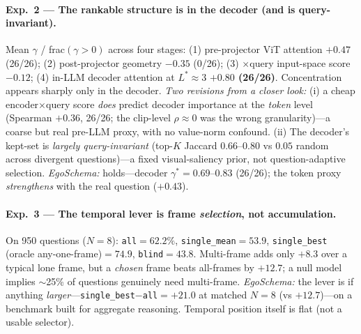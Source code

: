 \documentclass[11pt]{article}
\newcommand{\gm}{\gamma}
\begin{document}
\paragraph{Exp.~2 --- The rankable structure is in the decoder (and is query-invariant).} Mean
$\gm$ / frac$(\gm{>}0)$ across four stages: (1) pre-projector ViT attention $+0.47$ (26/26); (2)
post-projector geometry $-0.35$ (0/26); (3) $\times$query input-space score $-0.12$; (4) in-LLM
decoder attention at $L^{\!*}{\approx}3$ \textbf{$+0.80$ (26/26)}. Concentration appears sharply
only in the decoder. \emph{Two revisions from a closer look:} (i) a cheap encoder$\times$query
score \emph{does} predict decoder importance at the \emph{token} level (Spearman $+0.36$, 26/26;
the clip-level $\rho{\approx}0$ was the wrong granularity)---a coarse but real pre-LLM proxy, with
no value-norm confound. (ii) The decoder's kept-set is \emph{largely query-invariant} (top-$K$
Jaccard $0.66$--$0.80$ vs $0.05$ random across divergent questions)---a fixed visual-saliency
prior, not question-adaptive selection. \emph{EgoSchema:} holds---decoder $\gm^{*}=0.69$--$0.83$
(26/26); the token proxy \emph{strengthens} with the real question ($+0.43$).

\paragraph{Exp.~3 --- The temporal lever is frame \emph{selection}, not accumulation.} On 950
questions ($N{=}8$): \texttt{all}$=62.2\%$, \texttt{single\_mean}$=53.9$, \texttt{single\_best}
(oracle any-one-frame)$=74.9$, \texttt{blind}$=43.8$. Multi-frame adds only $+8.3$ over a typical
lone frame, but a \emph{chosen} frame beats all-frames by $+12.7$; a null model implies $\sim$25\%
of questions genuinely need multi-frame. \emph{EgoSchema:} the lever is if anything
\emph{larger}---\texttt{single\_best}$-$\texttt{all}$=+21.0$ at matched $N{=}8$ (vs $+12.7$)---on
a benchmark built for aggregate reasoning. Temporal position itself is flat (not a usable selector).
\end{document}
